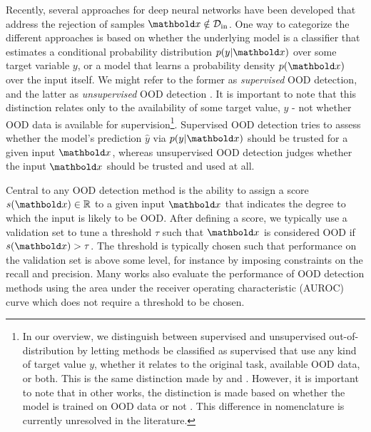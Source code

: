 Recently, several approaches for deep neural networks have been developed that address the rejection of samples $\xb\notin\mathcal{D}_{\text{in}}$. 
One way to categorize the different approaches is based on whether the underlying model is a classifier that estimates a conditional probability distribution $p(y|\xb)$ over some target variable $y$, or a model that learns a probability density $p(\xb)$ over the input itself. We might refer to the former as \emph{supervised} OOD detection, and the latter as \emph{unsupervised} OOD detection \cite{graham_denoising_2023,liu_unsupervised_2023a}. It is important to note that this distinction relates only to the availability of some target value, $y$ - not whether OOD data is available for supervision\footnote{
    In our overview, we distinguish between supervised and unsupervised out-of-distribution by letting methods be classified as supervised that use any kind of target value $y$, whether it relates to the original task, available OOD data, or both. This is the same distinction made by \textcite{graham_denoising_2023} and \textcite{liu_unsupervised_2023a}. 
    However, it is important to note that in other works, the distinction is made based on whether the model is trained on OOD data or not \cite{hendrycks_baseline_2017,liu_energy-based_2020}. This difference in nomenclature is currently unresolved in the literature. 
}. 
Supervised OOD detection tries to assess whether the model's prediction $\hat{y}$ via $p(y|\xb)$ should be trusted for a given input $\xb$, whereas unsupervised OOD detection judges whether the input $\xb$ should be trusted and used at all. 

Central to any OOD detection method is the ability to assign a score $s(\xb) \in \mathbb{R}$ to a given input $\xb$ that indicates the degree to which the input is likely to be OOD. After defining a score, we typically use a validation set to tune a threshold $\tau$ such that $\xb$ is considered OOD if $s(\xb) > \tau$. The threshold is typically chosen such that performance on the validation set is above some level, for instance by imposing constraints on the recall and precision. Many works also evaluate the performance of OOD detection methods using the area under the receiver operating characteristic (AUROC) curve which does not require a threshold to be chosen.

